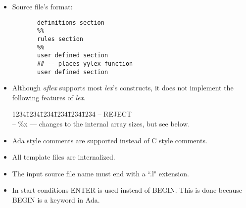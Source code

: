 \begin{itemize}
 \item Source file's format:
   \small
   \begin{verbatim}
       definitions section
       %% 
       rules section
       %% 
       user defined section
       ## -- places yylex function
       user defined section
   \end{verbatim}
   \normalsize


 \item Although {\sl aflex} supports most {\sl lex}'s constructs, it does not
	implement the following features of {\sl lex}.
\begin{tabbing}
1234\=1234\=1234\=1234\=1234\=1234 \kill
   \>-- REJECT \\
   \>-- \%x \>\>\>---  changes to the internal array sizes, but see below.
 \end{tabbing}
    
 \item  Ada style comments are supported instead of C style comments.

 \item  All template files are internalized.

 \item  The input source file name must end with a ``.l" extension.

 \item	In start conditions ENTER is used instead of BEGIN.  This is
	done because BEGIN is a keyword in Ada.
\end{itemize}

